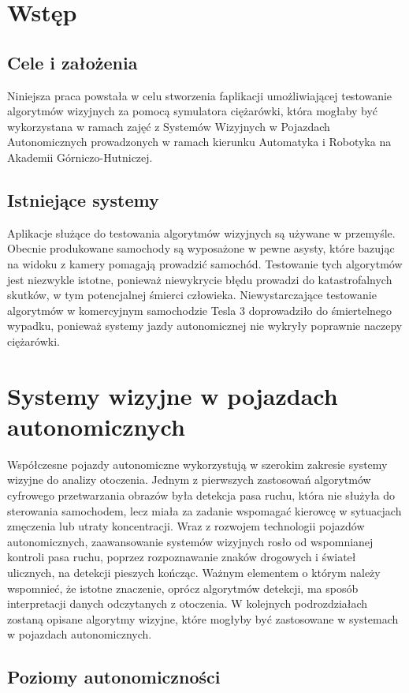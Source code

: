 \chapter{Wstęp}
\section{Cele i założenia}
Niniejsza praca powstała w celu stworzenia faplikacji umożliwiającej testowanie algorytmów wizyjnych za pomocą symulatora ciężarówki, która mogłaby być wykorzystana w ramach zajęć z Systemów Wizyjnych w Pojazdach Autonomicznych prowadzonych w ramach kierunku Automatyka i Robotyka na Akademii Górniczo-Hutniczej.

\section{Istniejące systemy}
Aplikacje służące do testowania algorytmów wizyjnych są używane w przemyśle. Obecnie produkowane samochody są wyposażone w pewne asysty, które bazując na widoku z kamery pomagają prowadzić samochód. Testowanie tych algorytmów jest niezwykle istotne, ponieważ niewykrycie błędu prowadzi do katastrofalnych skutków, w tym potencjalnej śmierci człowieka. Niewystarczające testowanie algorytmów w komercyjnym samochodzie Tesla 3 doprowadziło do śmiertelnego wypadku, ponieważ systemy jazdy autonomicznej nie wykryły poprawnie naczepy ciężarówki.


\chapter{Systemy wizyjne w pojazdach autonomicznych}
Współczesne pojazdy autonomiczne wykorzystują w szerokim zakresie systemy wizyjne do analizy otoczenia. Jednym z pierwszych zastosowań algorytmów cyfrowego przetwarzania obrazów była detekcja pasa ruchu, która nie służyła do sterowania samochodem, lecz miała za zadanie wspomagać kierowcę w sytuacjach zmęczenia lub utraty koncentracji. Wraz z rozwojem technologii pojazdów autonomicznych, zaawansowanie systemów wizyjnych rosło od wspomnianej kontroli pasa ruchu, poprzez rozpoznawanie znaków drogowych i świateł ulicznych, na detekcji pieszych kończąc. Ważnym elementem o którym należy wspomnieć, że istotne znaczenie, oprócz algorytmów detekcji, ma sposób interpretacji danych odczytanych z otoczenia. W kolejnych podrozdziałach zostaną opisane algorytmy wizyjne, które mogłyby być zastosowane w systemach w pojazdach autonomicznych. 

\section{Poziomy autonomiczności}

